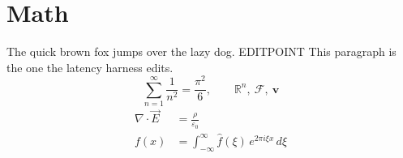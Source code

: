 \documentclass{article}
\begin{document}
\section{Math}
The quick brown fox jumps over the lazy dog. EDITPOINT This paragraph is the
one the latency harness edits.
\[ \sum_{n=1}^{\infty}\frac{1}{n^2}=\frac{\pi^2}{6},\qquad \mathbb{R}^n,\ \mathcal{F},\ \symbf{v} \]
\begin{align}
  \nabla\cdot\vec{E} &= \frac{\rho}{\varepsilon_0} \\
  f(x) &= \int_{-\infty}^{\infty}\hat f(\xi)\,e^{2\pi i\xi x}\,d\xi
\end{align}
\end{document}
